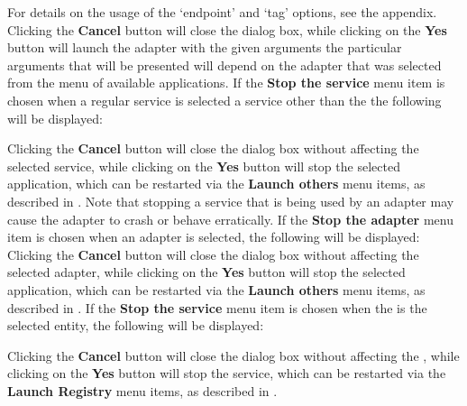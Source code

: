 For details on the usage of the `endpoint' and `tag' options, see the 
 appendix.
Clicking the \textbf{Cancel} button will close the dialog box, while clicking on the
\textbf{Yes} button will launch the adapter with the given arguments \longDash{} the
particular arguments that will be presented will depend on the adapter that was selected
from the menu of available applications.
\secondaryEnd
\condPage
{}
If the \textbf{Stop the service} menu item is chosen when a regular service is selected
\longDash{} a service other than the \emph{\RS} \longDash{} the following will be
displayed:

Clicking the \textbf{Cancel} button will close the dialog box without affecting the
selected service, while clicking on the \textbf{Yes} button will stop the selected
application, which can be restarted via the \textbf{Launch others \textellipsis} menu
items, as described in .
Note that stopping a service that is being used by an adapter may cause the adapter to
crash or behave erratically.
\secondaryEnd
{}
If the \textbf{Stop the adapter} menu item is chosen when an adapter is selected, the
following will be displayed:
\\

Clicking the \textbf{Cancel} button will close the dialog box without affecting the
selected adapter, while clicking on the \textbf{Yes} button will stop the selected
application, which can be restarted via the \textbf{Launch others \textellipsis} menu
items, as described in .
\secondaryEnd
{}
If the \textbf{Stop the service} menu item is chosen when the \emph{\RS} is the selected
entity, the following will be displayed:

Clicking the \textbf{Cancel} button will close the dialog box without affecting the
\emph{\RS}, while clicking on the \textbf{Yes} button will stop the service, which can be
restarted via the \textbf{Launch Registry} menu items, as described in
.
\secondaryEnd
\primaryEnd{}